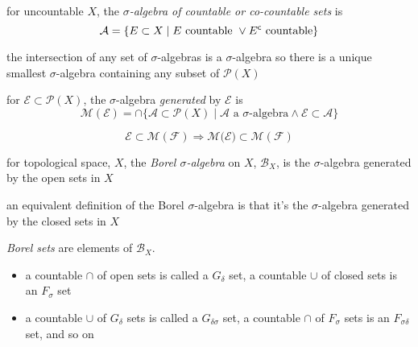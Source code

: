 \begin{defn}
  for uncountable $X$, the
  \emph{$\sigma$-algebra of countable or co-countable sets}
  is
  \[
  \mathcal{A} =
  \{ E\subset X\mid E\text{ countable }\lor {E}^{\mathsf{c}}\text{ countable}\}
  \]
\end{defn}

\begin{rem}{}
  the intersection of any set of $\sigma$-algebras is a $\sigma$-algebra
  so there is a unique smallest $\sigma$-algebra containing any
  subset of ${\mathscr{P}(X)}$
\end{rem}

\begin{defn}
  for ${\mathcal{E}\subset\mathscr{P}(X)}$,
  the $\sigma$-algebra \emph{generated} by $\mathcal{E}$ is
  \[
  \mathcal{M}(\mathcal{E}) =
  \cap\{\mathcal{A}\subset\mathscr{P}(X)\mid
  \mathcal{A}\text{ a $\sigma$-algebra} \land
  \mathcal{E}\subset\mathcal{A}\}
  \]
\end{defn}

\begin{lem}\label{lem:1.1}\label{lem:01:gensa}
  \[
  \mathcal{E}\subset\mathcal{M}(\mathcal{F})
  \Rightarrow
  \mathcal{M}(\mathcal{E)}\subset\mathcal{M}(\mathcal{F})
  \]
\end{lem}

\begin{defn}
  for topological space, $X$, the
  \emph{Borel $\sigma$-algebra} on $X$, $\mathcal{B}_X$,
  is the $\sigma$-algebra generated by the open sets in $X$
\end{defn}

\begin{rem}{}
  an equivalent definition of the Borel $\sigma$-algebra
  is that it's the $\sigma$-algebra generated by the
  closed sets in $X$
\end{rem}

\begin{defn}
  \emph{Borel sets} are elements of $\mathcal{B}_X$.
  \begin{itemize}
  \item a countable $\cap$ of open sets is called a
    $G_\delta$ set,
    a countable $\cup$ of closed sets is an $F_\sigma$ set
  \item a countable $\cup$ of $G_\delta$ sets is called a
    $G_{\delta\sigma}$ set,
    a countable $\cap$ of $F_\sigma$ sets is an $F_{\sigma\delta}$ set,
    and so on
  \end{itemize}
\end{defn}

